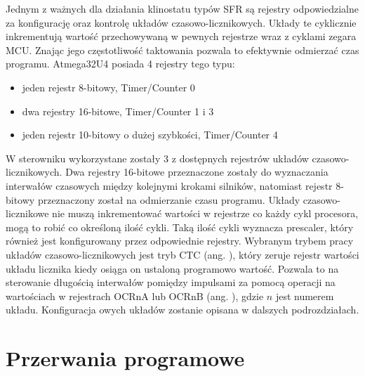 Jednym z ważnych dla działania klinostatu typów SFR są rejestry odpowiedzialne za konfigurację oraz kontrolę układów czasowo-licznikowych. Układy te cyklicznie inkrementują wartość przechowywaną w pewnych rejestrze wraz z cyklami zegara MCU. Znając jego częstotliwość taktowania pozwala to efektywnie odmierzać czas programu. Atmega32U4 posiada 4 rejestry tego typu: 
\begin{itemize}
	\item jeden rejestr 8-bitowy, Timer/Counter 0
	\item dwa rejestry 16-bitowe, Timer/Counter 1 i 3
	\item jeden rejestr 10-bitowy o dużej szybkości, Timer/Counter 4
\end{itemize}

W sterowniku wykorzystane zostały 3 z dostępnych rejestrów układów czasowo-licznikowych. Dwa rejestry 16-bitowe przeznaczone zostały do wyznaczania interwałów czasowych między kolejnymi krokami silników, natomiast rejestr 8-bitowy przeznaczony został na odmierzanie czasu programu. Układy czasowo-licznikowe nie muszą inkrementować wartości w rejestrze co każdy cykl procesora, mogą to robić co określoną ilość cykli. Taką ilość cykli wyznacza prescaler, który również jest konfigurowany przez odpowiednie rejestry. Wybranym trybem pracy układów czasowo-licznikowych jest tryb CTC (ang. ), który zeruje rejestr wartości układu licznika kiedy osiąga on ustaloną programowo wartość. Pozwala to na sterowanie długością interwałów pomiędzy impulsami za pomocą operacji na wartościach w  rejestrach OCRnA lub OCRnB (ang. ), gdzie $n$ jest numerem układu. Konfiguracja owych układów zostanie opisana w dalszych podrozdziałach.

\section{Przerwania programowe}

